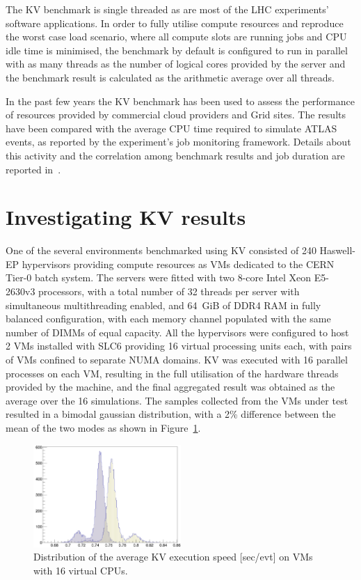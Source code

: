 The KV benchmark is single threaded as are most of the LHC experiments'
software applications. In order to fully utilise compute resources and reproduce
the worst case load scenario, where all compute slots are running jobs and
CPU idle time is minimised, the benchmark by default is configured to run in parallel 
with as many threads as the number of logical cores 
provided by the server and the benchmark result is calculated as the arithmetic 
average over all threads.

In the past few years the KV benchmark has been used to assess the performance of
resources provided by commercial cloud providers and Grid sites. The results 
have been compared with the average CPU time required to simulate ATLAS events, 
as reported by the experiment's job monitoring framework. Details about this activity 
and the correlation among benchmark results and job duration are reported 
in~\cite{bmk}.


\section{Investigating KV results}
One of the several environments benchmarked using KV consisted of
 240 Haswell-EP hypervisors providing compute
resources as VMs dedicated to the CERN Tier-0 batch system. The servers were
fitted with two 8-core Intel Xeon E5-2630v3 processors, with a total number  
of 32 threads per server with simultaneous multithreading enabled, and 64~GiB    
of DDR4 RAM in fully balanced configuration, with each memory channel populated with
the same number of DIMMs of equal capacity. All the hypervisors were configured 
to host 2 VMs installed with SLC6 providing 16 virtual processing units each, with pairs of VMs 
confined to separate NUMA domains. KV was executed with 16 parallel processes 
on each VM, resulting in the full utilisation of the hardware threads provided
by the machine, and the final aggregated result was obtained as the average over 
the 16 simulations. The samples collected from the VMs under test resulted in a bimodal gaussian 
distribution, with a 2\% difference between the 
mean of the two modes as shown in Figure~\ref{dual-mode-gaussian}.


\begin{figure}[ht]
\begin{center}
\includegraphics[width=0.5\textwidth]{images/dual-mode-gaussian.png}
\end{center}
\caption{\label{dual-mode-gaussian} Distribution of the average KV execution speed [sec/evt] on  VMs with 16 virtual CPUs. }
\end{figure}


